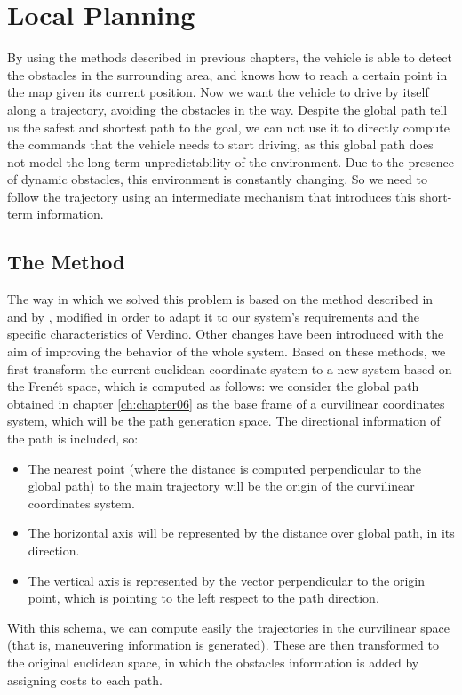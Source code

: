 
\graphicspath{{./images/chapter07/bmps/}{./images/chapter07/vects/}{./images/chapter07/}}

\chapter{Local Planning}\label{ch:chapter07}

By using the methods described in previous chapters, the vehicle is able to detect the obstacles in the surrounding area, and knows how to reach a certain point in the map given its current position. Now we want the vehicle to drive by itself along a trajectory, avoiding the obstacles in the way.
Despite the global path tell us the safest and shortest path to the goal, we can not use it to directly compute the commands that the vehicle needs to start driving, as this global path does not model the long term unpredictability of the environment. Due to the presence of dynamic obstacles, this environment is constantly changing. So we need to follow the trajectory using an intermediate mechanism that introduces this short-term information.

\section{The Method}\label{ch:chapter07_01}

The way in which we solved this problem is based on the method described in \cite{chu2012local} and by \cite{thrun2006stanley}, modified in order to adapt it to our system's requirements and the specific characteristics of Verdino. Other changes have been introduced with the aim of improving the behavior of the whole system. Based on these methods, we first transform the current euclidean coordinate system to a new system based on the Frenét space, which is computed as follows: we consider the global path obtained in chapter \ref{ch:chapter06} as the base frame of a curvilinear coordinates system, which will be the path generation space. The directional information of the path is included, so:
\begin{itemize}
 \item The nearest point (where the distance is computed perpendicular to the global path) to the main trajectory will be the origin of the curvilinear coordinates system.
 \item The horizontal axis will be represented by the distance over global path, in its direction.
 \item The vertical axis is represented by the vector perpendicular to the origin point, which is pointing to the left respect to the path direction.
\end{itemize}
With this schema, we can compute easily the trajectories in the curvilinear space (that is, maneuvering information is generated). These are then transformed to the original euclidean space, in which the obstacles information is added by assigning costs to each path.

